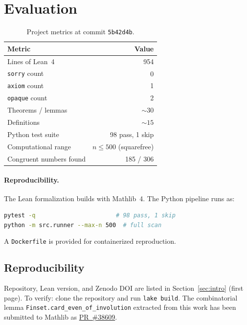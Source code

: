 \documentclass[11pt,a4paper]{article}
\theoremstyle{definition}
\newcommand{\lean}[1]{\texttt{#1}}
\begin{document}
\section{Evaluation}\label{sec:eval}

\begin{table}[ht]
\centering
\begin{tabular}{@{}lr@{}}
\toprule
\textbf{Metric} & \textbf{Value} \\
\midrule
Lines of Lean~4            & 954 \\
\lean{sorry} count         & 0 \\
\lean{axiom} count         & 1 \\
\lean{opaque} count        & 2 \\
Theorems / lemmas          & ${\sim}30$ \\
Definitions                & ${\sim}15$ \\
Python test suite          & 98 pass, 1 skip \\
Computational range        & $n \le 500$ (squarefree) \\
Congruent numbers found    & 185 / 306 \\
\bottomrule
\end{tabular}
\caption{Project metrics at commit \texttt{5b42d4b}.}
\label{tab:metrics}
\end{table}

\paragraph{Reproducibility.}
The Lean formalization builds with Mathlib~4.  The Python pipeline
runs as:
\begin{lstlisting}[language=bash,keywordstyle={},commentstyle={}]
pytest -q                       # 98 pass, 1 skip
python -m src.runner --max-n 500  # full scan
\end{lstlisting}
A \texttt{Dockerfile} is provided for containerized reproduction.

\subsection*{Reproducibility}

Repository, Lean version, and Zenodo DOI are listed in
Section~\ref{sec:intro} (first page).  To verify: clone the
repository and run \texttt{lake build}.
The combinatorial lemma
\texttt{Finset.card\_even\_of\_involution} extracted from this
work has been submitted to Mathlib as
\href{https://github.com/leanprover-community/mathlib4/pull/38609}{PR~\#38609}.
\end{document}

